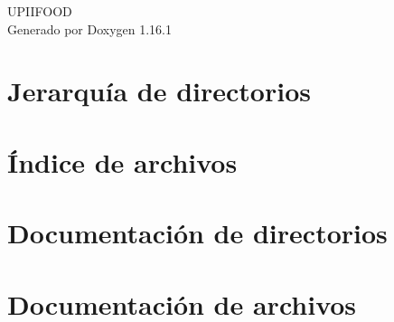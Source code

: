 \documentclass[twoside]{book}
\newcommand{\+}{\discretionary{\mbox{\scriptsize$\hookleftarrow$}}{}{}}
\newcommand{\clearemptydoublepage}{%
    \newpage{\pagestyle{empty}\cleardoublepage}%
  }
\begin{document}
  \raggedbottom
    \hypersetup{pageanchor=false,
                bookmarksnumbered=true,
                pdfencoding=unicode
               }
  \begin{titlepage}
  \vspace*{7cm}
  \begin{center}%
  {\Large UPIIFOOD}\\
  \vspace*{1cm}
  {\large Generado por Doxygen 1.16.1}\\
  \end{center}
  \end{titlepage}
  \clearemptydoublepage
  \tableofcontents
  \clearemptydoublepage
  \hypersetup{pageanchor=true}
\chapter{Jerarquía de directorios}

\chapter{Índice de archivos}

\chapter{Documentación de directorios}

\chapter{Documentación de archivos}


































  \backmatter
  \newpage
  \clearemptydoublepage
  \printindex
\end{document}
